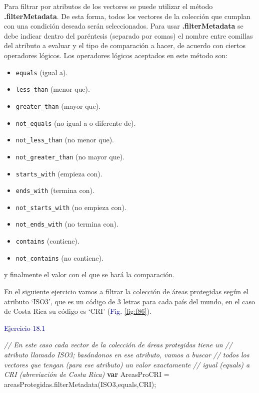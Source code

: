 \documentclass[
  12pt,
  letterpaper,
  twoside]{book}
\newenvironment{Shaded}{\begin{snugshade}}{\end{snugshade}}
\newcommand{\CommentTok}[1]{\textcolor[rgb]{0.24,0.58,0.00}{\textit{#1}}}
\newcommand{\ControlFlowTok}[1]{\textcolor[rgb]{0.00,0.00,0.00}{\textbf{#1}}}
\newcommand{\FunctionTok}[1]{\textcolor[rgb]{0.48,0.12,0.64}{#1}}
\newcommand{\NormalTok}[1]{#1}
\newcommand{\OperatorTok}[1]{\textcolor[rgb]{0.00,0.00,0.00}{#1}}
\newcommand{\StringTok}[1]{\textcolor[rgb]{0.87,0.29,0.22}{#1}}
\providecommand{\tightlist}{%
  \setlength{\itemsep}{0pt}\setlength{\parskip}{0pt}}
\newcommand\boldpurple[1]{\textcolor{darkpurple}{\textbf{#1}}}
\begin{document}
Para filtrar por atributos de los vectores se puede utilizar el método \boldpurple{.filterMetadata}. De esta forma, todos los vectores de la colección que cumplan con una condición deseada serán seleccionados. Para usar \boldpurple{.filterMetadata} se debe indicar dentro del paréntesis (separado por comas) el nombre entre comillas del atributo a evaluar y el tipo de comparación a hacer, de acuerdo con ciertos operadores lógicos. Los operadores lógicos aceptados en este método son:

\begin{itemize}
\tightlist
\item
  \texttt{equals} (igual a).
\item
  \texttt{less\_than} (menor que).
\item
  \texttt{greater\_than} (mayor que).
\item
  \texttt{not\_equals} (no igual a o diferente de).
\item
  \texttt{not\_less\_than} (no menor que).
\item
  \texttt{not\_greater\_than} (no mayor que).
\item
  \texttt{starts\_with} (empieza con).
\item
  \texttt{ends\_with} (termina con).
\item
  \texttt{not\_starts\_with} (no empieza con).
\item
  \texttt{not\_ends\_with} (no termina con).
\item
  \texttt{contains} (contiene).
\item
  \texttt{not\_contains} (no contiene).
\end{itemize}

y finalmente el valor con el que se hará la comparación.

En el siguiente ejercicio vamos a filtrar la colección de áreas protegidas según el atributo `ISO3', que es un código de 3 letras para cada país del mundo, en el caso de Costa Rica su código es `CRI' (\textcolor{darkblue}{Fig.} \ref{fig:f86}).

\textcolor{darkblue}{Ejercicio 18.1}

\begin{Shaded}
\begin{Highlighting}[]
\CommentTok{// En este caso cada vector de la colección de áreas protegidas tiene un }
\CommentTok{// atributo llamado \textquotesingle{}ISO3\textquotesingle{}; basándonos en ese atributo, vamos a buscar }
\CommentTok{// todos los vectores que tengan (para ese atributo) un valor exactamente }
\CommentTok{// igual (\textquotesingle{}equals\textquotesingle{}) a \textquotesingle{}CRI\textquotesingle{} (abreviación de Costa Rica)}
\ControlFlowTok{var}\NormalTok{ AreasProCRI }\OperatorTok{=}\NormalTok{ areasProtegidas}\OperatorTok{.}\FunctionTok{filterMetadata}\NormalTok{(}\StringTok{\textquotesingle{}ISO3\textquotesingle{}}\OperatorTok{,}\StringTok{\textquotesingle{}equals\textquotesingle{}}\OperatorTok{,}\StringTok{\textquotesingle{}CRI\textquotesingle{}}\NormalTok{)}\OperatorTok{;} 
\end{Highlighting}
\end{Shaded}
\end{document}
